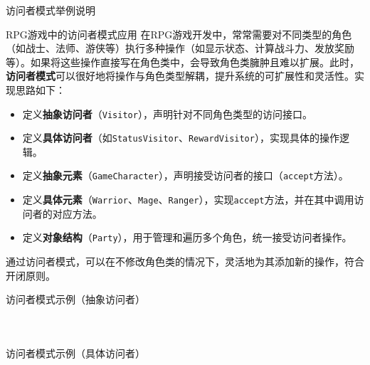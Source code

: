 \documentclass[UTF8,aspectratio=169]{beamer}
\begin{document}
\begin{frame}{访问者模式举例说明}
    \begin{exampleytublock}{RPG游戏中的访问者模式应用}
        在RPG游戏开发中，常常需要对不同类型的角色（如战士、法师、游侠等）执行多种操作（如显示状态、计算战斗力、发放奖励等）。如果将这些操作直接写在角色类中，会导致角色类臃肿且难以扩展。此时，\textbf{访问者模式}可以很好地将操作与角色类型解耦，提升系统的可扩展性和灵活性。实现思路如下：
        \begin{itemize}
            \item 定义\textbf{抽象访问者}（\texttt{Visitor}），声明针对不同角色类型的访问接口。
            \item 定义\textbf{具体访问者}（如\texttt{StatusVisitor}、\texttt{RewardVisitor}），实现具体的操作逻辑。
            \item 定义\textbf{抽象元素}（\texttt{GameCharacter}），声明接受访问者的接口（\texttt{accept}方法）。
            \item 定义\textbf{具体元素}（\texttt{Warrior}、\texttt{Mage}、\texttt{Ranger}），实现\texttt{accept}方法，并在其中调用访问者的对应方法。
            \item 定义\textbf{对象结构}（\texttt{Party}），用于管理和遍历多个角色，统一接受访问者操作。
        \end{itemize}
        通过访问者模式，可以在不修改角色类的情况下，灵活地为其添加新的操作，符合开闭原则。
    \end{exampleytublock}
\end{frame}

\begin{frame}{访问者模式示例（抽象访问者）}
    \begin{columns}
        \begin{column}{0.48\textwidth}
            \inputminted[firstline=1, lastline=20]{cpp}{code/visitor_pattern.cpp}
        \end{column}
        \begin{column}{0.48\textwidth}
            \inputminted[firstline=22, lastline=28]{cpp}{code/visitor_pattern.cpp}
        \end{column}
    \end{columns}
\end{frame}

\begin{frame}{访问者模式示例（具体访问者）}
    \begin{columns}
        \begin{column}{0.48\textwidth}
            \inputminted[firstline=30, lastline=43]{cpp}{code/visitor_pattern.cpp}
        \end{column}
        \begin{column}{0.48\textwidth}
            \inputminted[firstline=45, lastline=58]{cpp}{code/visitor_pattern.cpp}
        \end{column}
    \end{columns}
\end{frame}
\end{document}
